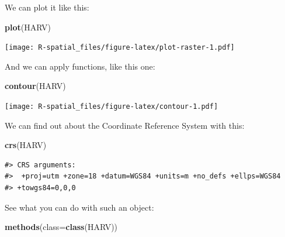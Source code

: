 \documentclass[]{book}
\newenvironment{Shaded}{\begin{snugshade}}{\end{snugshade}}
\newcommand{\KeywordTok}[1]{\textcolor[rgb]{0.13,0.29,0.53}{\textbf{#1}}}
\newcommand{\DataTypeTok}[1]{\textcolor[rgb]{0.13,0.29,0.53}{#1}}
\newcommand{\NormalTok}[1]{#1}
\theoremstyle{definition}
\theoremstyle{definition}
\theoremstyle{definition}
\theoremstyle{remark}
\begin{document}
We can plot it like this:

\begin{Shaded}
\begin{Highlighting}[]
\KeywordTok{plot}\NormalTok{(HARV)}
\end{Highlighting}
\end{Shaded}

\texttt{[image: R-spatial\_files/figure-latex/plot-raster-1.pdf]}

And we can apply functions, like this one:

\begin{Shaded}
\begin{Highlighting}[]
\KeywordTok{contour}\NormalTok{(HARV)}
\end{Highlighting}
\end{Shaded}

\texttt{[image: R-spatial\_files/figure-latex/contour-1.pdf]}

We can find out about the Coordinate Reference System with this:

\begin{Shaded}
\begin{Highlighting}[]
\KeywordTok{crs}\NormalTok{(HARV)}
\end{Highlighting}
\end{Shaded}

\begin{verbatim}
#> CRS arguments:
#>  +proj=utm +zone=18 +datum=WGS84 +units=m +no_defs +ellps=WGS84
#> +towgs84=0,0,0
\end{verbatim}

See what you can do with such an object:

\begin{Shaded}
\begin{Highlighting}[]
\KeywordTok{methods}\NormalTok{(}\DataTypeTok{class=}\KeywordTok{class}\NormalTok{(HARV))}
\end{Highlighting}
\end{Shaded}
\end{document}

